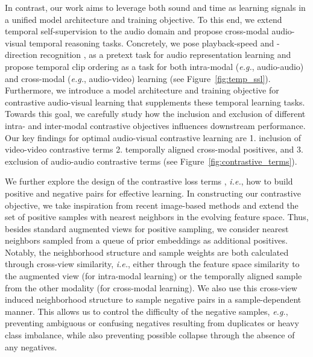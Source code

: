 \documentclass[letterpaper]{article} %
\newcommand{\eg}{\emph{e.g.}}
\newcommand{\ie}{\emph{i.e.}}
\begin{document}
In contrast, our work aims to leverage both sound and time as learning signals in a unified model architecture and training objective. 
To this end, we extend temporal self-supervision to the audio domain and propose cross-modal audio-visual temporal reasoning tasks. 
Concretely, we pose playback-speed and -direction recognition \cite{wei2018learning,benaim2020speednet,jenni2020video}, as a pretext task for audio representation learning and propose temporal clip ordering as a task for both intra-modal (\eg, audio-audio) and cross-modal (\eg, audio-video) learning (see Figure~\ref{fig:temp_ssl}). 
Furthermore, we introduce a model architecture and training objective for contrastive audio-visual learning that supplements these temporal learning tasks. 
Towards this goal, we carefully study how the inclusion and exclusion of different intra- and inter-modal contrastive objectives influences downstream performance. 
Our key findings for optimal audio-visual contrastive learning are 1. inclusion of video-video contrastive terms 2. temporally aligned cross-modal positives, and 3. exclusion of audio-audio contrastive terms (see Figure~\ref{fig:contrastive_terms}).

We further explore the design of the contrastive loss terms \cite{wu2018unsupervised}, \ie, how to build positive and negative pairs for effective learning. 
In constructing our contrastive objective, we take inspiration from recent image-based methods \cite{dwibedi2021little,koohpayegani2021mean} and extend the set of positive samples with nearest neighbors in the evolving feature space. 
Thus, besides standard augmented views for positive sampling, we consider nearest neighbors sampled from a queue of prior embeddings as additional positives. 
Notably, the neighborhood structure and sample weights are both calculated through cross-view similarity, \ie, either through the feature space similarity to the augmented view (for intra-modal learning) or the temporally aligned sample from the other modality (for cross-modal learning). 
We also use this cross-view induced neighborhood structure to sample negative pairs in a sample-dependent manner.
This allows us to control the difficulty of the negative samples, \eg, preventing ambiguous or confusing negatives resulting from duplicates or heavy class imbalance, while also preventing possible collapse through the absence of any negatives.
\end{document}
